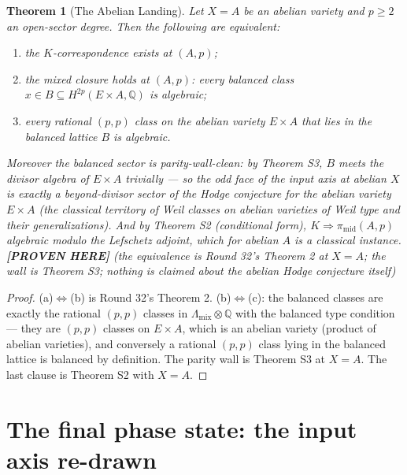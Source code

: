 \documentclass[11pt]{article}
\newtheorem{theorem}{Theorem}
\newcommand{\PROVEN}{\textbf{[PROVEN HERE]}}
\newcommand{\Q}{\mathbb{Q}}
\begin{document}
\begin{theorem}[The Abelian Landing]\label{thm:s4}
Let $X=A$ be an abelian variety and $p\ge2$ an open-sector degree. Then the
following are equivalent:
\begin{enumerate}[label=(\alph*)]
\item the $K$-correspondence exists at $(A,p)$;
\item the mixed closure holds at $(A,p)$: every balanced class
$x\in B\subseteq H^{2p}(E\times A,\Q)$ is algebraic;
\item every rational $(p,p)$ class on the \emph{abelian variety}
$E\times A$ that lies in the balanced lattice $B$ is algebraic.
\end{enumerate}
Moreover the balanced sector is parity-wall-clean: by Theorem \emph{S3},
$B$ meets the divisor algebra of $E\times A$ trivially --- so the odd face
of the input axis at abelian $X$ is exactly a \emph{beyond-divisor} sector
of the Hodge conjecture for the abelian variety $E\times A$ (the classical
territory of Weil classes on abelian varieties of Weil type and their
generalizations). And by Theorem \emph{S2} (conditional form),
$K\Rightarrow\pi_{\mathrm{mid}}(A,p)$ algebraic modulo the Lefschetz
adjoint, which for abelian $A$ is a classical instance.
\PROVEN{} (the equivalence is Round 32's Theorem 2 at $X=A$; the wall is
Theorem S3; nothing is claimed about the abelian Hodge conjecture itself)
\end{theorem}

\begin{proof}
(a)$\Leftrightarrow$(b) is Round 32's Theorem 2. (b)$\Leftrightarrow$(c):
the balanced classes are exactly the rational $(p,p)$ classes in
$\Lambda_{\mathrm{mix}}\otimes\Q$ with the balanced type condition --- they
are $(p,p)$ classes on $E\times A$, which is an abelian variety (product of
abelian varieties), and conversely a rational $(p,p)$ class lying in the
balanced lattice is balanced by definition. The parity wall is Theorem S3
at $X=A$. The last clause is Theorem S2 with $X=A$.
\end{proof}

\section{The final phase state: the input axis re-drawn}
\end{document}
